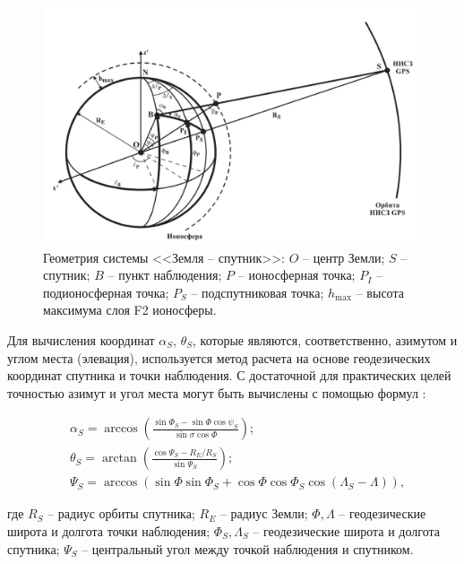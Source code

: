 \documentclass[a4paper]{article}
\begin{document}
\begin{figure}[!h]
\centering
\includegraphics[width = \linewidth]{pics/pic1.png}
\caption{Геометрия системы <<Земля -- спутник>>: $O$ -- центр Земли; $S$ -- спутник; $B$ -- пункт наблюдения; $P$ -- ионосферная точка; $P_I$ -- подионосферная точка; $P_S$ -- подспутниковая точка; $h_\text{max}$ -- высота максимума слоя F2 ионосферы. \cite{afraimovich}}
\label{pic1}
\end{figure}

Для вычисления координат $\alpha_S$, $\theta_S$, которые являются, соответственно, азимутом и углом места (элевация), используется метод расчета на основе геодезических координат спутника и точки наблюдения. С достаточной для практических целей точностью азимут и угол места могут быть вычислены с помощью формул \cite{kotyashkin}:

\begin{equation}
	\begin{aligned}
	&\alpha_S = \arccos{\left(\frac{\sin{\Phi_S} - \sin{\Phi}\cos{\psi_S}}{\sin{\sigma}\cos{\Phi}}\right)};\\
	&\theta_S = \arctan{\left(\frac{\cos{\Psi_S} - R_E/R_S}{\sin{\Psi_S}}\right)};\\
	&\Psi_S = \arccos{\left(\sin{\Phi}\sin{\Phi_S} + \cos{\Phi}\cos{\Phi_S}\cos{\left(\Lambda_S - \Lambda\right)}\right)},
	\end{aligned}
\end{equation}

где $R_S$ -- радиус орбиты спутника; $R_E$ -- радиус Земли; $\Phi, \Lambda$ -- геодезические широта и долгота точки наблюдения; $\Phi_S, \Lambda_S$ -- геодезические широта и долгота спутника; $\Psi_S$ -- центральный угол между точкой наблюдения и спутником.
\end{document}
